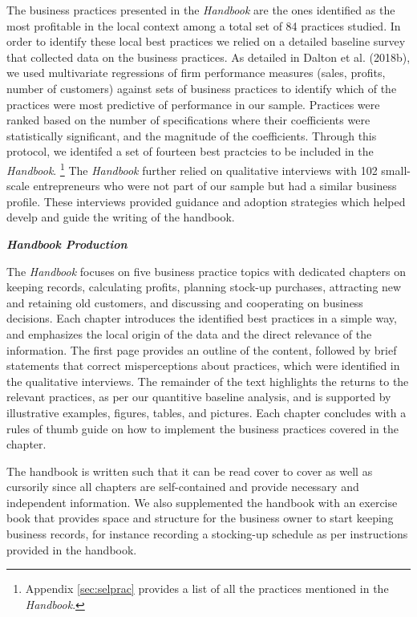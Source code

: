 \documentclass[11.5pt]{article}
\begin{document}
The business practices presented in the \emph{Handbook} are the ones identified as the most profitable in the local context among a total set of 84 practices studied. In order to identify these local best practices we relied on a detailed baseline survey that collected data on the business practices. As detailed in Dalton et al. (2018b), we used multivariate regressions of firm performance measures (sales, profits, number of customers) against sets of business practices to identify which of the practices were most predictive of performance in our sample. Practices were ranked based on the number of specifications where their coefficients were statistically significant, and the magnitude of the coefficients. Through this protocol, we identifed a set of fourteen best practcies to be included in the \emph{Handbook}. \footnote{Appendix \ref{sec:selprac} provides a list of all the practices mentioned in the \emph{Handbook}.} The \emph{Handbook} further relied on qualitative interviews with 102 small-scale entrepreneurs who were not part of our sample but had a similar business profile. These interviews provided guidance and adoption strategies which helped develp and guide the writing of the handbook.   
 
\noindent \emph{\textbf{Handbook Production}}\

The \emph{Handbook} focuses on five business practice topics with dedicated chapters on keeping records, calculating profits, planning stock-up purchases, attracting new and retaining old customers, and discussing and cooperating on business decisions. Each chapter introduces the identified best practices in a simple way, and emphasizes the local origin of the data and the direct relevance of the information. The first page provides an outline of the content, followed by brief statements that correct misperceptions about practices, which were identified in the qualitative interviews. The remainder of the text highlights the returns to the relevant practices, as per our quantitive baseline analysis, and is supported by illustrative examples, figures, tables, and pictures. Each chapter concludes with a rules of thumb guide on how to implement the business practices covered in the chapter.

The handbook is written such that it can be read cover to cover as well as cursorily since all chapters are self-contained and provide necessary and independent information. We also supplemented the handbook with an exercise book that provides space and structure for the business owner to start keeping business records, for instance recording a stocking-up schedule as per instructions provided in the handbook.
\end{document}
